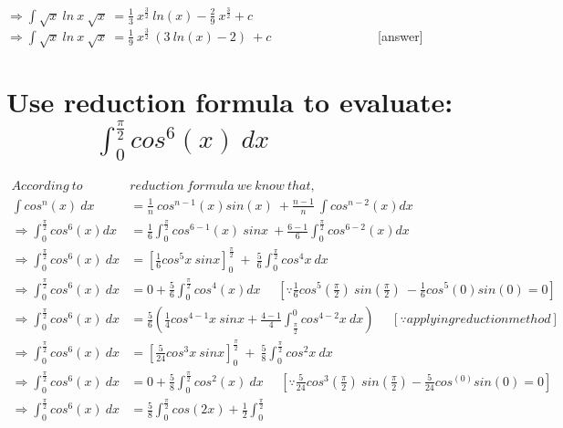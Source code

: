 \documentclass[12pt]{article}%
\begin{document}
$\Rightarrow \int \sqrt{x} \: ln\:x \: \sqrt{x} \: = \frac{1}{3} \: x^{\frac{3}{2}} \: ln(x) - \frac{2}{9} \:x^{\frac{3}{2}} + c$ \\

$\Rightarrow \int \sqrt{x} \: ln\:x \: \sqrt{x} \: = \frac{1}{9} \: x^{\frac{3}{2}} \: (3\:ln(x) - 2) \: + c$ \ \ \ \ \ \ \ \ \ \ \ \ \ \ \ \ [answer]\\


    
\section{Use reduction formula to evaluate: \ \ \ \ \ \
$\int_{0}^{\frac{\pi}{2}} cos^6 (x) \:dx$}

\begin{align*}
    According \: to \ &reduction \ formula \ we \ know \ that, \\
    \int cos^n(x) \: dx &= \frac{1}{n} \: cos^{n-1}(x) sin(x) \: + \frac{n-1}{n} \: \int cos^{n-2}(x) dx \\
    \Rightarrow \int_{0}^{\frac{\pi}{2}} cos^{6} (x)dx &= \frac{1}{6} \int_{0}^{\frac{\pi}{2}} cos ^{6-1}(x)\:sinx \:+  \frac{6-1}{6} \int_{0}^{\frac{\pi}{2}} cos^{6-2}(x)dx \\
    \Rightarrow \int_{0}^{\frac{\pi}{2}} cos^{6} (x) \: dx &= [\frac{1}{6} cos^{5}x\:sinx]_{0}^{\frac{\pi}{2}} \:+\: \frac{5}{6} \int_{0}^{\frac{\pi}{2}} cos^{4}x\:dx \\
    \Rightarrow \int_{0}^{\frac{\pi}{2}} cos^{6}(x) \: dx &= 0 + \frac{5}{6} \int_{0}^{\frac{\pi}{2}} cos^{4}(x) dx \ \ \ \ \ \ [\because \frac{1}{6} cos^{5}(\frac{\pi}{2}) \: sin(\frac{\pi}{2}) \: - \frac{1}{6} cos^{5}(0) sin(0)=0]\\
    \Rightarrow \int_{0}^{\frac{\pi}{2}} cos^{6} (x)\: dx &= \frac{5}{6} (\frac{1}{4} cos^{4-1}x \: sinx +\frac{4-1}{4}\int_{\frac{\pi}{2}}^{0} cos^{4-2}x \:dx)  \ \ \ \ \ \ [\because applying reduction method]\\
    \Rightarrow \int_{0}^{\frac{\pi}{2}} cos^{6}(x) \: dx &= \left [ \frac{5}{24} cos^{3}x\:sinx \right ]_{0}^{\frac{\pi}{2}} \: + \: \frac{5}{8} \int_{0}^{\frac{\pi}{2}} cos^{2}x \: dx\\
    \Rightarrow \int_{0}^{\frac{\pi}{2}} cos^{6} (x)\: dx &= 0 + \frac{5}{8} \int_{0}^{\frac{\pi}{2}}cos^{2}(x)\:dx \ \ \ \ \ \ \left[\because \frac{5}{24} cos^3(\frac{\pi}{2})\:sin(\frac{\pi}{2}) - \frac{5}{24} cos^(0)sin(0) = 0 \right]\\
    \Rightarrow \int_{0}^{\frac{\pi}{2}} cos^{6} (x)\: dx &= \frac{5}{8} \int_{0}^{\frac{\pi}{2}}cos(2x) + \frac{1}{2} \int_{0}^{\frac{\pi}{2}}\\
\end{align*}
\end{document}
